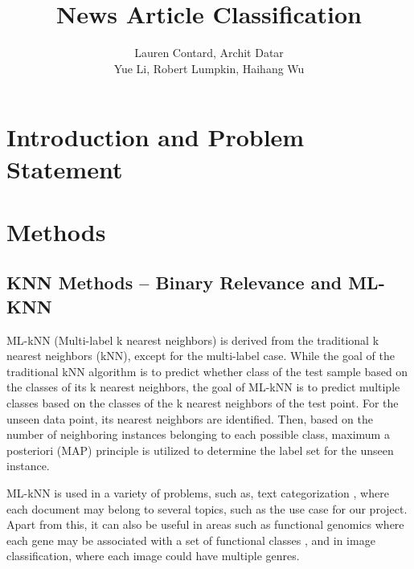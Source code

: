 \documentclass[11pt]{article}
\title{\Huge News Article Classification}
\author{Lauren Contard, Archit Datar \\ 
Yue Li, Robert Lumpkin, Haihang Wu}
\date{}
\begin{document}
\begin{singlespace}
    \maketitle
\end{singlespace}


\section{Introduction and Problem Statement}

\section{Methods}

\subsection{KNN Methods -- Binary Relevance and ML-KNN}
ML-kNN (Multi-label k nearest neighbors) is derived from the traditional k nearest neighbors (kNN), except for the multi-label case. While the goal of the traditional kNN algorithm is to predict whether class of the test sample based on the classes of its k nearest neighbors, the goal of ML-kNN is to predict multiple classes based on the classes of the k nearest neighbors of the test point. For the unseen data point, its nearest neighbors are identified. Then, based on the number of neighboring instances belonging to each possible class, maximum a posteriori (MAP) principle is utilized to determine the label set for the unseen instance. 

ML-kNN is used in a variety of problems, such as, text categorization \autocite{McCallum99multi-labeltext}, where each document may belong to several topics, such as the use case for our project. Apart from this, it can also be useful in areas such as functional genomics where each gene may be associated with a set of functional classes \autocite{KernelMulti-labelClassification}, and in image classification, where each image could have multiple genres.\autocite{Boutell04learningmulti-label}  

\end{document}
